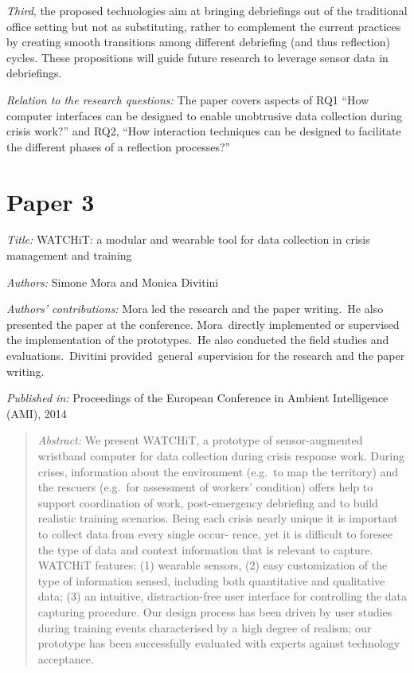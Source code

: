 \emph{Third}, the proposed technologies aim at bringing debriefings out
of the traditional office setting but not as substituting, rather to
complement the current practices by creating smooth transitions among
different debriefing (and thus reflection) cycles. These propositions
will guide future research to leverage sensor data in debriefings.

\emph{Relation to the research questions:} The paper covers aspects of
RQ1 ``How computer interfaces can be designed to enable unobtrusive data
collection during crisis work?'' and RQ2, ``How interaction techniques
can be designed to facilitate the different phases of a reflection
processes?''

\section{Paper 3}\label{paper-3}

\emph{Title:} WATCHiT: a modular and wearable tool for data collection
in crisis management and training

\emph{Authors:} Simone Mora and Monica Divitini

\emph{Authors' contributions:} Mora led the research and the paper
writing.~He also presented the paper at the conference. Mora~directly
implemented or supervised the implementation of the prototypes.~He also
conducted the field studies and evaluations.~Divitini
provided~general~supervision for the research and the paper writing.

\emph{Published in:} Proceedings of the European Conference in Ambient
Intelligence (AMI), 2014

\begin{quote}
\emph{Abstract:} We present WATCHiT, a prototype of sensor-augmented
wristband computer for data collection during crisis response work.
During crises, information about the environment (e.g.~to map the
territory) and the rescuers (e.g.~for assessment of workers' condition)
offers help to support coordination of work, post-emergency debriefing
and to build realistic training scenarios. Being each crisis nearly
unique it is important to collect data from every single occur- rence,
yet it is difficult to foresee the type of data and context information
that is relevant to capture. WATCHiT features: (1) wearable sensors, (2)
easy customization of the type of information sensed, including both
quantitative and qualitative data; (3) an intuitive, distraction-free
user interface for controlling the data capturing procedure. Our design
process has been driven by user studies during training events
characterised by a high degree of realism; our prototype has been
successfully evaluated with experts against technology acceptance.
\end{quote}

